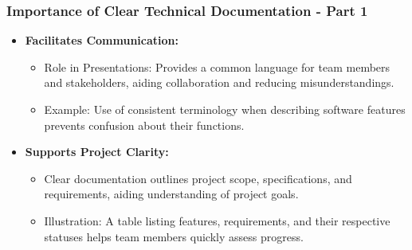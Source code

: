 \documentclass{beamer}
\begin{document}
\begin{frame}[fragile]
    \frametitle{Importance of Clear Technical Documentation - Part 1}
    \begin{itemize}
        \item \textbf{Facilitates Communication:}
        \begin{itemize}
            \item Role in Presentations: Provides a common language for team members and stakeholders, aiding collaboration and reducing misunderstandings.
            \item Example: Use of consistent terminology when describing software features prevents confusion about their functions.
        \end{itemize}
        
        \item \textbf{Supports Project Clarity:}
        \begin{itemize}
            \item Clear documentation outlines project scope, specifications, and requirements, aiding understanding of project goals.
            \item Illustration: A table listing features, requirements, and their respective statuses helps team members quickly assess progress.
        \end{itemize}
    \end{itemize}
\end{frame}
\end{document}
